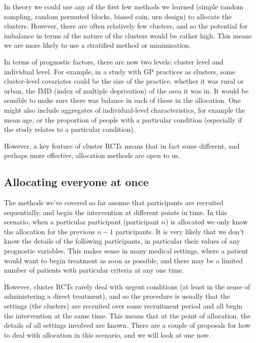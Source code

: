 \documentclass[
  openany]{book}
\theoremstyle{definition}
\theoremstyle{definition}
\theoremstyle{definition}
\theoremstyle{definition}
\theoremstyle{remark}
\begin{document}
In theory we could use any of the first few methods we learned (simple random sampling, random permuted blocks, biased coin, urn design) to allocate the clusters. However, there are often relatively few clusters, and so the potential for imbalance in terms of the nature of the clusters would be rather high. This means we are more likely to use a stratified method or minimisation.

In terms of prognostic factors, there are now two levels: cluster level and individual level. For example, in a study with GP practices as clusters, some cluster-level covariates could be the size of the practice, whether it was rural or urban, the IMD (index of multiple deprivation) of the area it was in. It would be sensible to make sure there was balance in each of these in the allocation. One might also include aggregates of individual-level characteristics, for example the mean age, or the proportion of people with a particular condition (especially if the study relates to a particular condition).

However, a key feature of cluster RCTs means that in fact some different, and perhaps more effective, allocation methods are open to us.

\subsection{Allocating everyone at once}\label{allocating-everyone-at-once}

The methods we've covered so far assume that participants are recruited sequentially, and begin the intervention at different points in time. In this scenario, when a particular participant (participant \(n\)) is allocated we only know the allocation for the previous \(n-1\) participants. It is very likely that we don't know the details of the following participants, in particular their values of any prognostic variables. This makes sense in many medical settings, where a patient would want to begin treatment as soon as possible, and there may be a limited number of patients with particular criteria at any one time.

However, cluster RCTs rarely deal with urgent conditions (at least in the sense of administering a direct treatment), and so the procedure is usually that the settings (the clusters) are recruited over some recruitment period and all begin the intervention at the same time. This means that at the point of allocation, the details of all settings involved are known.
There are a couple of proposals for how to deal with allocation in this scenario, and we will look at one now.
\end{document}
